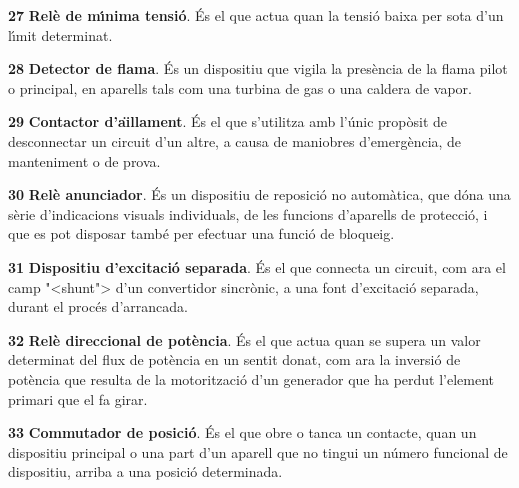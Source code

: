 \begin{multicols}{2}
\begin{list}{}
\item[\textbf{27}]   
\textbf{Rel\`{e} de m\'{\i}nima tensi\'{o}}. \'{E}s el que
actua quan la tensi\'{o} baixa per sota d'un l\'{\i}mit determinat.

\item[\textbf{28}]   
\textbf{Detector de flama}. \'{E}s un dispositiu que vigila la pres\`{e}ncia de la flama pilot o principal, en aparells tals com una turbina de gas o una caldera  de vapor.

\item[\textbf{29}]  
\textbf{Contactor d'a\"{\i}llament}. \'{E}s el que
s'utilitza amb l'\'{u}nic prop\`{o}sit de desconnectar un circuit d'un
altre,  a  causa de maniobres    d'emerg\`{e}ncia,  de manteniment o de
prova.

\item[\textbf{30}]  
 \textbf{Rel\`{e} anunciador}. \'{E}s un dispositiu de
reposici\'{o} no autom\`{a}tica, que d\'{o}na una s\`{e}rie d'indicacions visuals
individuals, de les funcions d'aparells de protecci\'{o}, i que es pot
disposar tamb\'{e} per efectuar una funci\'{o} de bloqueig.

\item[\textbf{31}]  
\textbf{Dispositiu d'excitaci\'{o}
separada}. \'{E}s el que connecta un circuit, com ara el camp {"<}shunt{">}
d'un convertidor sincr\`{o}nic, a una font d'excitaci\'{o} separada, durant el proc\'{e}s
d'arrancada.

\item[\textbf{32}]  
\textbf{Rel\`{e} direccional de pot\`{e}ncia}. \'{E}s el que actua quan se supera un valor determinat del
flux de pot\`{e}ncia en un sentit donat, com ara la inversi\'{o} de pot\`{e}ncia que resulta de la motoritzaci\'{o} d'un generador que ha perdut l'element primari que el fa girar.

\item[\textbf{33}]  
\textbf{Commutador de posici\'{o}}. \'{E}s el que
obre o tanca un contacte, quan un dispositiu principal o una part d'un aparell que no tingui un n\'{u}mero funcional de dispositiu, arriba a una posici\'{o} determinada.


\end{list}
\end{multicols}
